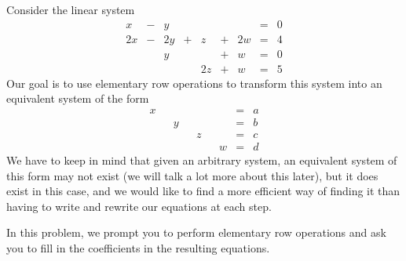 \documentclass{ximera}
\begin{document}
\begin{exploration}\label{init:augmentedmatrixex}
Consider the linear system
\begin{equation}\label{eq:sys20originalsystem1}
\begin{array}{ccccccccc}
      x &- &y&&&&&= &0 \\
	 2x& -&2y&+&z&+&2w&=&4\\
     & &y&&&+&w&=&0\\
     & &&&2z&+&w&=&5
    \end{array}
\end{equation}
Our goal is to use elementary row operations to transform this system into an equivalent system of the form
\begin{equation*}
\begin{array}{ccccccccc}
     x & &&&&&&= &a \\
	 & &y&&&&&=&b\\
    & &&&z&&&=&c\\
    & &&&&&w&=&d
  \end{array}
   \end{equation*}
 We have to keep in mind that given an arbitrary system, an equivalent system of this form may not exist (we will talk a lot more about this later), but it does exist in this case, and we would like to find a more efficient way of finding it than having to write and rewrite our equations at each step.   
 
In this problem, we prompt you to perform elementary row operations and ask you to fill in the coefficients in the resulting equations.

    
 


\end{exploration}
\end{document}
